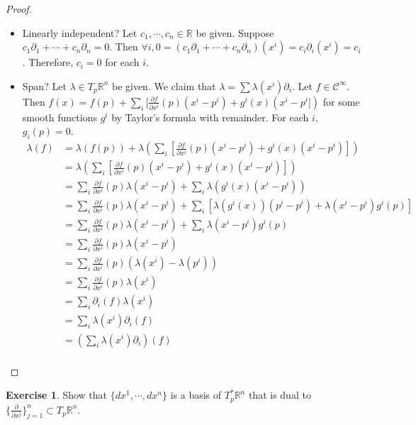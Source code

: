 \documentclass[12pt, psamsfonts]{amsart}
\theoremstyle{definition}
\newtheorem{exer}[thm]{Exercise}
\theoremstyle{remark}
\numberwithin{equation}{section}
\begin{document}
\begin{proof}
  $ $
  \begin{itemize}
    \item
      Linearly independent?
      Let $c_1, \cdots, c_n \in \mathbb{R}$ be given.
      Suppose $c_1\partial_1 + \cdots + c_n\partial_n = 0$.
      Then $\forall i, 0 = (c_1\partial_1 + \cdots + c_n\partial_n)(x^i) = c_i\partial_i(x^i) = c_i$.
      Therefore, $c_i = 0$ for each $i$.
    \item
      Span?
      Let $\lambda \in T_p \mathbb{R}^n$ be given.
      We claim that $\lambda = \sum \lambda(x^i)\partial_i$.
      Let $f \in \mathscr{C}^{\infty}$.
      Then $f(x) = f(p) + \sum_i [\frac{\partial f}{\partial x^i}(p)(x^i - p^i) + g^i(x)(x^i - p^i])$ for some smooth functions $g^i$ by Taylor's formula with remainder.
      For each $i$, $g_i(p) = 0$.
      \begin{align*}
        \lambda(f)
          &= \lambda(f(p)) + \lambda(\sum_i [\frac{\partial f}{\partial x^i}(p)(x^i - p^i) + g^i(x)(x^i - p^i)]) \\
          &= \lambda(\sum_i [\frac{\partial f}{\partial x^i}(p)(x^i - p^i) + g^i(x)(x^i - p^i)]) \\
          &= \sum_i \frac{\partial f}{\partial x^i}(p)\lambda(x^i - p^i) + \sum_i \lambda(g^i(x)(x^i - p^i)) \\
          &= \sum_i \frac{\partial f}{\partial x^i}(p)\lambda(x^i - p^i) + \sum_i [\lambda(g^i(x))(p^i - p^i) + \lambda(x^i - p^i)g^i(p)] \\
          &= \sum_i \frac{\partial f}{\partial x^i}(p)\lambda(x^i - p^i) + \sum_i \lambda(x^i - p^i)g^i(p) \\
          &= \sum_i \frac{\partial f}{\partial x^i}(p)\lambda(x^i - p^i) \\
          &= \sum_i \frac{\partial f}{\partial x^i}(p)(\lambda(x^i) - \lambda(p^i)) \\
          &= \sum_i \frac{\partial f}{\partial x^i}(p)\lambda(x^i) \\
          &= \sum_i \partial_i(f)\lambda(x^i) \\
          &= \sum_i \lambda(x^i)\partial_i(f) \\
          &= (\sum_i \lambda(x^i)\partial_i)(f) \\
      \end{align*}
  \end{itemize}
\end{proof}

\begin{exer}
  Show that $\{ dx^1, \cdots, dx^n \}$ is a basis of $T_p^*\mathbb{R}^n$ that is dual to $\{ \frac{\partial}{\partial x^j} \}^n_{j = 1} \subset T_p\mathbb{R}^n$.
\end{exer}
\end{document}
